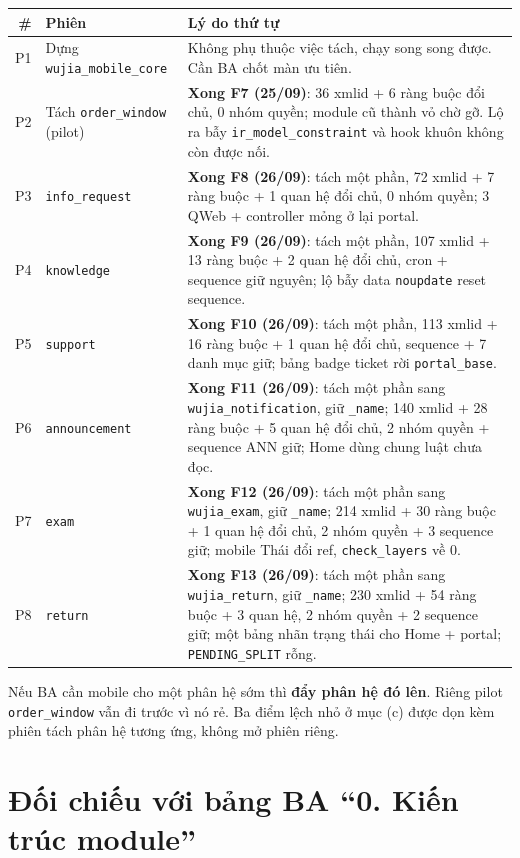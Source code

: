 \begin{center}
\small
\begin{tabularx}{\textwidth}{rlX}
\toprule
\# & Phiên & Lý do thứ tự \\
\midrule
P1 & Dựng \texttt{wujia\_mobile\_core} & Không phụ thuộc việc tách, chạy song song được. Cần BA chốt màn ưu tiên. \\
P2 & Tách \texttt{order\_window} (pilot) & \textbf{Xong F7 (25/09)}: 36 xmlid + 6 ràng buộc đổi chủ, 0 nhóm quyền; module cũ thành vỏ chờ gỡ. Lộ ra bẫy \texttt{ir\_model\_constraint} và hook khuôn không còn được nối. \\
P3 & \texttt{info\_request} & \textbf{Xong F8 (26/09)}: tách một phần, 72 xmlid + 7 ràng buộc + 1 quan hệ đổi chủ, 0 nhóm quyền; 3 QWeb + controller mỏng ở lại portal. \\
P4 & \texttt{knowledge} & \textbf{Xong F9 (26/09)}: tách một phần, 107 xmlid + 13 ràng buộc + 2 quan hệ đổi chủ, cron + sequence giữ nguyên; lộ bẫy data \texttt{noupdate} reset sequence. \\
P5 & \texttt{support} & \textbf{Xong F10 (26/09)}: tách một phần, 113 xmlid + 16 ràng buộc + 1 quan hệ đổi chủ, sequence + 7 danh mục giữ; bảng badge ticket rời \texttt{portal\_base}. \\
P6 & \texttt{announcement} & \textbf{Xong F11 (26/09)}: tách một phần sang \texttt{wujia\_notification}, giữ \texttt{\_name}; 140 xmlid + 28 ràng buộc + 5 quan hệ đổi chủ, 2 nhóm quyền + sequence ANN giữ; Home dùng chung luật chưa đọc. \\
P7 & \texttt{exam} & \textbf{Xong F12 (26/09)}: tách một phần sang \texttt{wujia\_exam}, giữ \texttt{\_name}; 214 xmlid + 30 ràng buộc + 1 quan hệ đổi chủ, 2 nhóm quyền + 3 sequence giữ; mobile Thái đổi ref, \texttt{check\_layers} về 0. \\
P8 & \texttt{return} & \textbf{Xong F13 (26/09)}: tách một phần sang \texttt{wujia\_return}, giữ \texttt{\_name}; 230 xmlid + 54 ràng buộc + 3 quan hệ, 2 nhóm quyền + 2 sequence giữ; một bảng nhãn trạng thái cho Home + portal; \texttt{PENDING\_SPLIT} rỗng. \\
\bottomrule
\end{tabularx}
\end{center}

Nếu BA cần mobile cho một phân hệ sớm thì \textbf{đẩy phân hệ đó lên}. Riêng pilot
\texttt{order\_window} vẫn đi trước vì nó rẻ. Ba điểm lệch nhỏ ở mục (c) được dọn kèm phiên
tách phân hệ tương ứng, không mở phiên riêng.

\section{Đối chiếu với bảng BA ``0. Kiến trúc module''}
\label{sec:adr27-ba}

